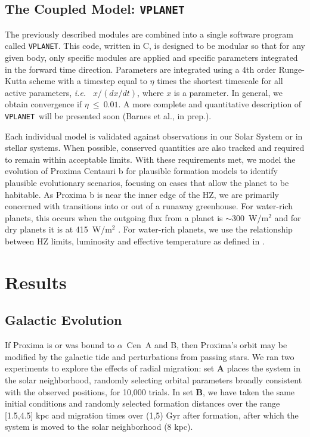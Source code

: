 \documentclass[preprint,12pt]{aastex}
\def\ie{{\it i.e.\ }}
\def\acen{{$\alpha$~Cen}}
\def\vplanet{\texttt{\footnotesize{VPLANET}}\xspace}
\begin{document}
\subsection{The Coupled Model: \vplanet}
\label{sec:models:vplanet}
The previously described modules are combined into a single software program
called \vplanet. This code, written in C, is designed to be
modular so that for any given body, only specific modules are applied
and specific parameters integrated in the forward time direction. 
Parameters are integrated
using a 4th order Runge-Kutta scheme with a timestep equal to $\eta$
times the shortest timescale for all active parameters, \ie
$x/(dx/dt)$, where $x$ is a parameter. In general, we obtain convergence if
$\eta~\le~0.01$. A more complete and quantitative description of
\vplanet~will be presented soon (Barnes et al., in prep.). 

Each individual model is validated against observations in our Solar
System or in stellar systems. When possible, conserved quantities are
also tracked and required to remain within acceptable limits. With
these requirements met, we model the evolution of Proxima Centauri b
for plausible formation models to identify plausible evolutionary
scenarios, focusing on cases that allow the planet to be habitable. As
Proxima b is near the inner edge of the HZ, we are primarily concerned
with transitions into or out of a runaway greenhouse. For water-rich
planets, this occurs when the outgoing flux from a planet is $\sim
300$~W/m$^2$ \citep{Kasting93,Abe93} and for dry planets it is at
415~W/m$^2$ \citep{Abe11}. For water-rich planets, we use the
relationship between HZ limits, luminosity and effective temperature
as defined in \cite{Kopparapu13}.

\section{Results\label{sec:results}}

\subsection{Galactic Evolution}
\label{sec:results:galactic}

If Proxima is or was bound to \acen~A and B, then Proxima's orbit may
be modified by the galactic tide and perturbations from passing
stars. We ran two experiments to explore the effects of radial
migration: set \textbf{A} places the system in the solar neighborhood,
randomly selecting orbital parameters broadly consistent with the
observed positions, for 10,000 trials. In set \textbf{B}, we have
taken the same initial conditions and randomly selected formation
distances over the range [1.5,4.5] kpc \citep{Loebman16} and migration
times over (1,5) Gyr after formation, after which the system is moved
to the solar neighborhood (8 kpc).
\end{document}
